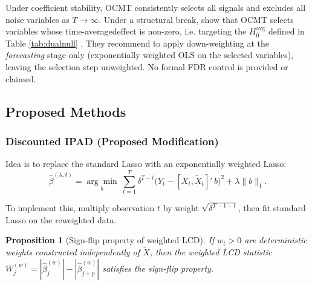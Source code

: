 \documentclass[12pt, a4paper]{article}
\newtheorem{proposition}{Proposition}
\begin{document}
Under coefficient stability, OCMT consistently selects all signals and excludes all noise variables as $T \to \infty$. Under a structural break, \citet{chudik2024ocmt} show that OCMT selects variables whose time-averagedeffect is non-zero, i.e. targeting the $H_0^{\text{avg}}$ defined in Table \ref{tab:dualnull} . 
They recommend to apply down-weighting at the \emph{forecasting} stage only (exponentially weighted OLS on the selected variables), leaving the selection step unweighted. No formal FDR control is provided or claimed.

\subsection{Proposed Methods}

\subsubsection{Discounted IPAD (Proposed Modification)}

Idea is to replace the standard Lasso with an exponentially weighted Lasso:
\[
    \hat{\beta}^{(\lambda,\delta)} = \underset{b}{\arg\min}\ \sum_{t=1}^T \delta^{T-t}\bigl(Y_t - [X_t, \tilde{X}_t]'\, b\bigr)^2 + \lambda\|b\|_1.
\]

To implement this, multiply observation $t$ by weight $\sqrt{\delta^{T-1-t}}$, then fit standard Lasso on the reweighted data.

\begin{proposition}[Sign-flip property of weighted LCD]
If $w_t > 0$ are deterministic weights constructed independently of $\tilde{X}$, then the weighted LCD statistic $W_j^{(w)} = |\hat{\beta}_j^{(w)}| - |\hat{\beta}_{j+p}^{(w)}|$ satisfies the sign-flip property.
\end{proposition}
\end{document}
